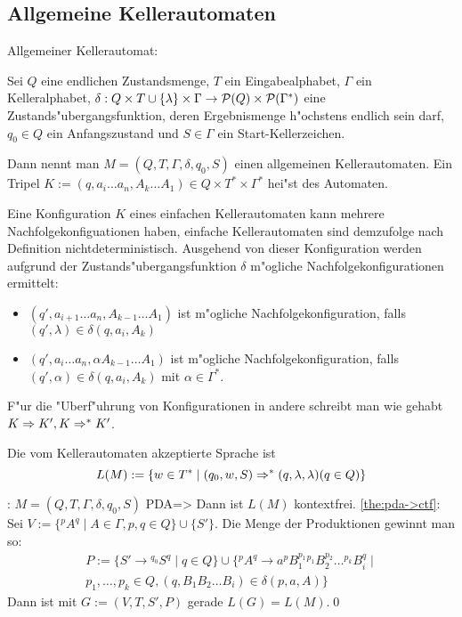 \subsection{Allgemeine Kellerautomaten}
 Allgemeiner Kellerautomat:{
  Sei $Q$ eine endlichen Zustandsmenge, 
  $T$ ein Eingabealphabet, 
  $\Gamma$ ein Kelleralphabet, 
  $\delta:Q\times T\cup\{\lambda\}\times\Gamma\to \cal P(Q)\times\cal P(\Gamma^*)$
  eine Zustands"ubergangsfunktion, deren Ergebnismenge h"ochstens endlich 
  sein darf, 
  $q_0\in Q$ ein Anfangszustand und 
  $S\in\Gamma$ ein Start-Kellerzeichen.

  Dann nennt man $M=(Q,T,\Gamma,\delta,q_0,S)$ einen allgemeinen Kellerautomaten. 
  Ein Tripel 
  $K:=(q,a_i\ldots a_n,A_k\ldots A_1)\in Q\times T^*\times\Gamma^*$ 
  hei"st  des Automaten.
  
  Eine Konfiguration $K$ eines einfachen Kellerautomaten kann mehrere 
  Nachfolgekonfiguationen haben, einfache Kellerautomaten sind demzufolge
  nach Definition nichtdeterministisch. Ausgehend von dieser Konfiguration
  werden aufgrund der Zustands"ubergangsfunktion $\delta$ m"ogliche 
  Nachfolgekonfigurationen ermittelt:
  \begin{itemize}
    \item 
      $(q',a_{i+1}\ldots a_n,A_{k-1}\ldots A_1)$ ist m"ogliche 
      Nachfolgekonfiguration, falls $(q',\lambda)\in\delta(q,a_i,A_k)$
    \item 
      $(q',a_i\ldots a_n,\alpha A_{k-1}\ldots A_1)$ ist m"ogliche 
      Nachfolgekonfiguration, falls $(q',\alpha)\in\delta(q,a_i,A_k)$ mit
      $\alpha\in\Gamma^*$.
    \end{itemize}
  F"ur die "Uberf"uhrung von Konfigurationen in andere schreibt man
  wie gehabt $K\dderivable K', K\derivable K'$. 

  Die vom Kellerautomaten akzeptierte Sprache ist
  \[L(M):=\{w\in T^*\mid (q_0,w,S)\derivable (q,\lambda,\lambda) (q\in Q)\}
    \]
  }
\theorem:
  $M=(Q,T,\Gamma,\delta,q_0,S)$ PDA=>{
  \label{the:pda->ctf}
  Dann ist $L(M)$ kontextfrei.
  }
\proof \ref{the:pda->ctf}:{
  Sei $V:=\{{}^pA^q \mid A \in\Gamma,p,q\in Q\}\cup \{S'\}$. 
  Die Menge der Produktionen gewinnt man so:
  \begin{multline*}
    P:=\{S'\to {}^{q_0}S^q\mid q\in Q\}\cup
    \{{}^{p}A^{q}\to 
      a{}^{p}B_1^{p_1}{}^{p_1}B_2^{p_2}\ldots {}^{p_{k}}B_i^{q}\mid\\
      p_1,\ldots,p_k\in Q,(q,B_1B_2\ldots B_i)\in\delta(p,a,A)
      \}
    \end{multline*}
  Dann ist mit $G:=(V,T,S',P)$ gerade $L(G)=L(M)$.\qed
  }
